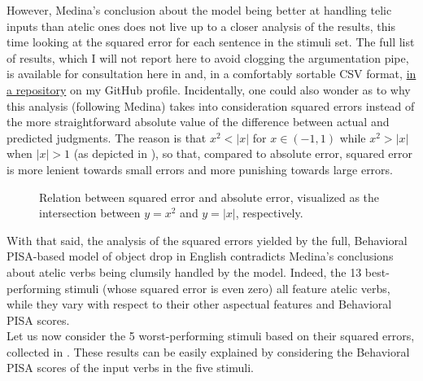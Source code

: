 However, Medina's conclusion about the model being better at handling telic inputs than atelic ones does not live up to a closer analysis of the results, this time looking at the squared error for each sentence in the stimuli set. The full list of results, which I will not report here to avoid clogging the argumentation pipe, is available for consultation here in  and, in a comfortably sortable CSV format, \href{https://github.com/giuliacappelli/dissertationData}{in a repository} on my GitHub profile. Incidentally, one could also wonder as to why this analysis (following Medina) takes into consideration squared errors instead of the more straightforward absolute value of the difference between actual and predicted judgments. The reason is that $x^2 < |x|$ for $x \in (-1,1)$ while $x^2 > |x|$ when $|x| > 1$ (as depicted in ), so that, compared to absolute error, squared error is more lenient towards small errors and more punishing towards large errors.

\begin{figure}[htb]
\caption{Relation between squared error and absolute error, visualized as the intersection between $y = x^2$ and $y = |x|$, respectively.}
\end{figure}

With that said, the analysis of the squared errors yielded by the full, Behavioral PISA-based model of object drop in English contradicts Medina's conclusions about atelic verbs being clumsily handled by the model. Indeed, the 13 best-performing stimuli (whose squared error is even zero) all feature atelic verbs, while they vary with respect to their other aspectual features and Behavioral PISA scores.\\
Let us now consider the 5 worst-performing stimuli based on their squared errors, collected in . These results can be easily explained by considering the Behavioral PISA scores of the input verbs in the five stimuli.

